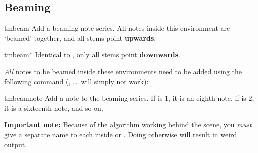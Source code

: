 \documentclass[11pt,a4paper]{ltxdoc}
\begin{document}
\subsection{Beaming}\label{sec:music-notes:beam}
\begin{docEnvironment}[doclang/environment content=beaming note commands]{tmbeam}{}
  Add a beaming note series. All notes inside this environment are `beamed' 
  together, and all stems point {\bfseries upwards}.
\end{docEnvironment}
\begin{docEnvironment}[doclang/environment content=beaming note commands]{tmbeam*}{}
  Identical to , only all stems point {\bfseries downwards}.
\end{docEnvironment}
\emph{All} notes to be beamed inside these environments need to be added using 
the following command (, \dots\ will simply not work):
\begin{docCommand}{tmbeamnote}{}
  Add a note to the beaming series. If  is $1$, it is an 
  eighth note, if  is $2$, it is a sixteenth note, and so 
  on.
\end{docCommand}
\begin{caution}
  {\bfseries\sffamily Important note:} Because of the algorithm working 
  behind the scene, you \emph{must} give a separate name to each  
  inside  or . Doing otherwise will result in 
  weird output.
\end{caution}
\end{document}
